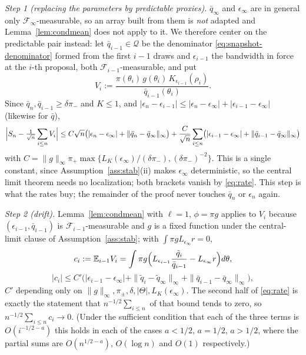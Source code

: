 \documentclass[10pt]{article}
\theoremstyle{plain}
\theoremstyle{definition}
\begin{document}
\emph{Step 1 (replacing the parameters by predictable proxies).} $\bar q_\infty$ and $\epsilon_\infty$ are in general only $\mathcal{F}_\infty$-measurable, so an array built from them is \emph{not} adapted and Lemma~\ref{lem:condmean} does not apply to it. We therefore center on the predictable pair instead: let $\bar q_{i-1}\in\mathcal{Q}$ be the denominator \eqref{eq:snapshot-denominator} formed from the first $i-1$ draws and $\epsilon_{i-1}$ the bandwidth in force at the $i$-th proposal, both $\mathcal{F}_{i-1}$-measurable, and put
\[
V_i:=\frac{\pi(\theta_i)\,g(\theta_i)\,K_{\epsilon_{i-1}}(\rho_i)}{\bar q_{i-1}(\theta_i)} .
\]
Since $\bar q_n,\bar q_{i-1}\ge\delta\pi_-$ and $K\le1$, and $|\epsilon_n-\epsilon_{i-1}|\le|\epsilon_n-\epsilon_\infty|+|\epsilon_{i-1}-\epsilon_\infty|$ (likewise for $\bar q$),
\[
\Bigl|S_n-\tfrac{1}{\sqrt n}\sum_{i\le n}V_i\Bigr|
\le C\sqrt n\bigl(|\epsilon_n-\epsilon_\infty|+\|\bar q_n-\bar q_\infty\|_\infty\bigr)
+\frac{C}{\sqrt n}\sum_{i\le n}\bigl(|\epsilon_{i-1}-\epsilon_\infty|+\|\bar q_{i-1}-\bar q_\infty\|_\infty\bigr)
\]
with $C=\|g\|_\infty\pi_+\max\{L_K(\epsilon_\infty)/(\delta\pi_-),(\delta\pi_-)^{-2}\}$. This is a single constant, since Assumption~\ref{ass:stab}(ii) makes $\epsilon_\infty$ deterministic, so the central limit theorem needs no localization; both brackets vanish by \eqref{eq:rate}. This step is what the rates buy; the remainder of the proof never touches $\bar q_n$ or $\epsilon_n$ again.

\emph{Step 2 (drift).} Lemma~\ref{lem:condmean} with $\ell=1$, $\phi=\pi g$ applies to $V_i$ because $(\epsilon_{i-1},\bar q_{i-1})$ is $\mathcal{F}_{i-1}$-measurable and $g$ is a fixed function under the central-limit clause of Assumption~\ref{ass:stab}; with $\int\pi gL_{\epsilon_\infty}r=0$,
\[
c_i:=\mathbb{E}_{i-1}V_i=\int\pi g\Bigl(L_{\epsilon_{i-1}}\frac{\tilde q_i}{\bar q_{i-1}}-L_{\epsilon_\infty}r\Bigr)d\theta,
\]
\[
|c_i|\le C'\bigl(|\epsilon_{i-1}-\epsilon_\infty|+\|\tilde q_i-\tilde q_\infty\|_\infty+\|\bar q_{i-1}-\bar q_\infty\|_\infty\bigr),
\]
$C'$ depending only on $\|g\|_\infty,\pi_\pm,\delta,|\Theta|,L_K(\epsilon_\infty)$. The second half of \eqref{eq:rate} is exactly the statement that $n^{-1/2}\sum_{i\le n}$ of that bound tends to zero, so $n^{-1/2}\sum_{i\le n}c_i\to0$. (Under the sufficient condition that each of the three terms is $O(i^{-1/2-a})$ this holds in each of the cases $a<1/2$, $a=1/2$, $a>1/2$, where the partial sums are $O(n^{1/2-a})$, $O(\log n)$ and $O(1)$ respectively.)
\end{document}
